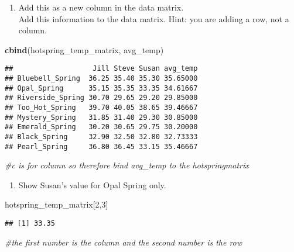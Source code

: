 \documentclass[
]{article}
\newenvironment{Shaded}{\begin{snugshade}}{\end{snugshade}}
\newcommand{\CommentTok}[1]{\textcolor[rgb]{0.56,0.35,0.01}{\textit{#1}}}
\newcommand{\DecValTok}[1]{\textcolor[rgb]{0.00,0.00,0.81}{#1}}
\newcommand{\FunctionTok}[1]{\textcolor[rgb]{0.13,0.29,0.53}{\textbf{#1}}}
\newcommand{\NormalTok}[1]{#1}
\providecommand{\tightlist}{%
  \setlength{\itemsep}{0pt}\setlength{\parskip}{0pt}}
\begin{document}
\begin{enumerate}
\def\labelenumi{\arabic{enumi}.}
\setcounter{enumi}{6}
\tightlist
\item
  Add this as a new column in the data matrix.\\
  Add this information to the data matrix. Hint: you are adding a row,
  not a column.
\end{enumerate}

\begin{Shaded}
\begin{Highlighting}[]
\FunctionTok{cbind}\NormalTok{(hotspring\_temp\_matrix, avg\_temp)}
\end{Highlighting}
\end{Shaded}

\begin{verbatim}
##                   Jill Steve Susan avg_temp
## Bluebell_Spring  36.25 35.40 35.30 35.65000
## Opal_Spring      35.15 35.35 33.35 34.61667
## Riverside_Spring 30.70 29.65 29.20 29.85000
## Too_Hot_Spring   39.70 40.05 38.65 39.46667
## Mystery_Spring   31.85 31.40 29.30 30.85000
## Emerald_Spring   30.20 30.65 29.75 30.20000
## Black_Spring     32.90 32.50 32.80 32.73333
## Pearl_Spring     36.80 36.45 33.15 35.46667
\end{verbatim}

\begin{Shaded}
\begin{Highlighting}[]
\CommentTok{\#c is for column so therefore bind avg\_temp to the hotspringmatrix}
\end{Highlighting}
\end{Shaded}

\begin{enumerate}
\def\labelenumi{\arabic{enumi}.}
\setcounter{enumi}{7}
\tightlist
\item
  Show Susan's value for Opal Spring only.
\end{enumerate}

\begin{Shaded}
\begin{Highlighting}[]
\NormalTok{hotspring\_temp\_matrix[}\DecValTok{2}\NormalTok{,}\DecValTok{3}\NormalTok{]}
\end{Highlighting}
\end{Shaded}

\begin{verbatim}
## [1] 33.35
\end{verbatim}

\begin{Shaded}
\begin{Highlighting}[]
\CommentTok{\#the first number is the column and the second number is the row}
\end{Highlighting}
\end{Shaded}
\end{document}

